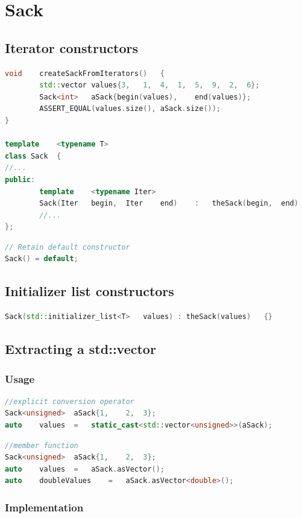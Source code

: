 \section{Sack}

\subsection{Iterator constructors}
\begin{lstlisting}[language=C++]
void	createSackFromIterators()	{
		std::vector	values{3,	1,	4,	1,	5,	9,	2,	6};
		Sack<int>	aSack{begin(values),	end(values)};
		ASSERT_EQUAL(values.size(),	aSack.size());
}

template	<typename T>
class Sack	{
//...
public:
		template	<typename Iter>
		Sack(Iter	begin,	Iter	end)	:	theSack(begin,	end)	{}
		//...
};
\end{lstlisting}

\begin{lstlisting}[language=C++]
// Retain default constructor
Sack() = default;
\end{lstlisting}

\subsection{Initializer list constructors}

\begin{lstlisting}[language=C++]
Sack(std::initializer_list<T>	values)	: theSack(values)	{}
\end{lstlisting}

\subsection{Extracting a std::vector}
\subsubsection{Usage}
\begin{lstlisting}[language=C++]
//explicit conversion operator
Sack<unsigned>	aSack{1,	2,	3};
auto	values	=	static_cast<std::vector<unsigned>>(aSack);
\end{lstlisting}

\begin{lstlisting}[language=C++]
//member function
Sack<unsigned>	aSack{1,	2,	3};
auto	values	=	aSack.asVector();
auto	doubleValues	=	aSack.asVector<double>();
\end{lstlisting}

\subsubsection{Implementation}

